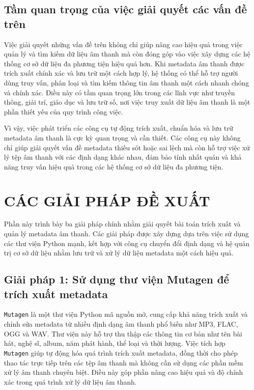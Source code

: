 \documentclass[conference]{IEEEtran}
\begin{document}
\subsection{Tầm quan trọng của việc giải quyết các vấn đề trên}

Việc giải quyết những vấn đề trên không chỉ giúp nâng cao hiệu quả trong việc quản lý và tìm kiếm dữ liệu âm thanh mà còn đóng góp vào việc xây dựng các hệ thống cơ sở dữ liệu đa phương tiện hiệu quả hơn. Khi metadata âm thanh được trích xuất chính xác và lưu trữ một cách hợp lý, hệ thống có thể hỗ trợ người dùng truy vấn, phân loại và tìm kiếm thông tin âm thanh một cách nhanh chóng và chính xác. Điều này có tầm quan trọng lớn trong các lĩnh vực như truyền thông, giải trí, giáo dục và lưu trữ số, nơi việc truy xuất dữ liệu âm thanh là một phần thiết yếu của quy trình công việc.

Vì vậy, việc phát triển các công cụ tự động trích xuất, chuẩn hóa và lưu trữ metadata âm thanh là cực kỳ quan trọng và cần thiết. Các công cụ này không chỉ giúp giải quyết vấn đề metadata thiếu sót hoặc sai lệch mà còn hỗ trợ việc xử lý tệp âm thanh với các định dạng khác nhau, đảm bảo tính nhất quán và khả năng truy vấn hiệu quả trong các hệ thống cơ sở dữ liệu đa phương tiện.



\section{CÁC GIẢI PHÁP ĐỀ XUẤT}

Phần này trình bày ba giải pháp chính nhằm giải quyết bài toán trích xuất và quản lý metadata âm thanh. Các giải pháp được xây dựng dựa trên việc sử dụng các thư viện Python mạnh, kết hợp với công cụ chuyển đổi định dạng và hệ quản trị cơ sở dữ liệu nhằm lưu trữ và xử lý dữ liệu metadata một cách hiệu quả.

\subsection{Giải pháp 1: Sử dụng thư viện Mutagen để trích xuất metadata}

\texttt{Mutagen} là một thư viện Python mã nguồn mở, cung cấp khả năng trích xuất và chỉnh sửa metadata từ nhiều định dạng âm thanh phổ biến như MP3, FLAC, OGG và WAV. Thư viện này hỗ trợ thu thập các thông tin cơ bản như tên bài hát, nghệ sĩ, album, năm phát hành, thể loại và thời lượng. Việc tích hợp \texttt{Mutagen} giúp tự động hóa quá trình trích xuất metadata, đồng thời cho phép thao tác trực tiếp trên các tệp âm thanh mà không cần sử dụng các phần mềm xử lý âm thanh chuyên biệt. Điều này góp phần nâng cao hiệu quả và độ chính xác trong quá trình xử lý dữ liệu âm thanh.
\end{document}
